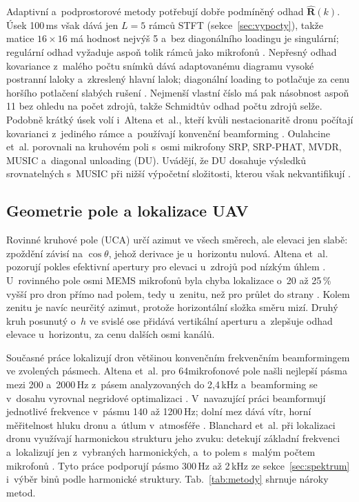 \documentclass[conference]{IEEEtran}
\begin{document}
Adaptivní a~podprostorové metody potřebují dobře podmíněný odhad $\hat{\mathbf{R}}(k)$. Úsek 100\,ms však dává jen $L=5$ rámců STFT (sekce~\ref{sec:vypocty}), takže matice $16\times16$ má hodnost nejvýš 5 a~bez diagonálního loadingu je singulární; regulární odhad vyžaduje aspoň tolik rámců jako mikrofonů \cite{capon1969mvdr}. Nepřesný odhad kovariance z~malého počtu snímků dává adaptovanému diagramu vysoké postranní laloky a~zkreslený hlavní lalok; diagonální loading to potlačuje za cenu horšího potlačení slabých rušení \cite{carlson1988loading}. Nejmenší vlastní číslo má pak násobnost aspoň 11 bez ohledu na počet zdrojů, takže Schmidtův odhad počtu zdrojů selže. Podobně krátký úsek volí i~Altena et~al., kteří kvůli nestacionaritě dronu počítají kovarianci z~jediného rámce a~používají konvenční beamforming \cite{altena2025frequency}. Oulahcine et~al. porovnali na kruhovém poli s~osmi mikrofony SRP, SRP-PHAT, MVDR, MUSIC a~diagonal unloading (DU). Uvádějí, že DU dosahuje výsledků srovnatelných s~MUSIC při nižší výpočetní složitosti, kterou však nekvantifikují \cite{oulahcine2024du}.

\subsection{Geometrie pole a lokalizace UAV}
Rovinné kruhové pole (UCA) určí azimut ve všech směrech, ale elevaci jen slabě: zpoždění závisí na $\cos\theta$, jehož derivace je u~horizontu nulová. Altena et~al. pozorují pokles efektivní apertury pro elevaci u~zdrojů pod nízkým úhlem \cite{altena2026joint}. U~rovinného pole osmi MEMS mikrofonů byla chyba lokalizace o~20 až 25\,\% vyšší pro dron přímo nad polem, tedy u~zenitu, než pro průlet do strany \cite{ghouli2026mems}. Kolem zenitu je navíc neurčitý azimut, protože horizontální složka směru mizí. Druhý kruh posunutý o~$h$ ve svislé ose přidává vertikální aperturu a~zlepšuje odhad elevace u~horizontu, za cenu dalších osmi kanálů.

Současné práce lokalizují dron většinou konvenčním frekvenčním beamformingem ve zvolených pásmech. Altena et~al. pro 64mikrofonové pole našli nejlepší pásma mezi 200 a~2000\,Hz z~pásem analyzovaných do 2{,}4\,kHz a~beamforming se v~dosahu vyrovnal negridové optimalizaci \cite{altena2025frequency}. V~navazující práci beamformují jednotlivé frekvence v~pásmu 140 až 1200\,Hz; dolní mez dává vítr, horní měřitelnost hluku dronu a~útlum v~atmosféře \cite{altena2026joint}. Blanchard et~al. při lokalizaci dronu využívají harmonickou strukturu jeho zvuku: detekují základní frekvenci a~lokalizují jen z~vybraných harmonických, a~to polem s~malým počtem mikrofonů \cite{blanchard2020acoustic}. Tyto práce podporují pásmo 300\,Hz až 2\,kHz ze sekce~\ref{sec:spektrum} i~výběr binů podle harmonické struktury. Tab.~\ref{tab:metody} shrnuje nároky metod.
\end{document}
